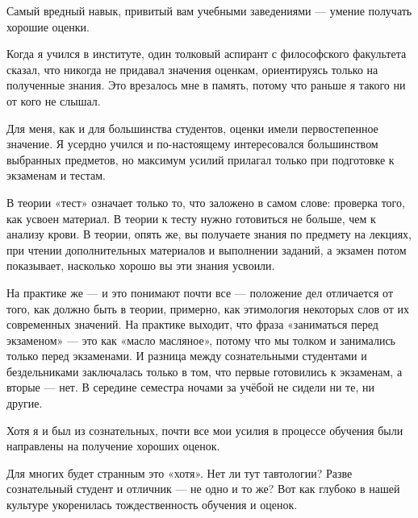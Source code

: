 \documentclass[ebook,12pt,oneside,openany]{memoir}
\begin{document}
\maketitle

Самый вредный навык, привитый вам учебными заведениями — умение
получать хорошие оценки. \newline

Когда я учился в институте, один толковый аспирант с философского
факультета сказал, что никогда не придавал значения оценкам,
ориентируясь только на полученные знания. Это врезалось мне в память,
потому что раньше я такого ни от кого не слышал. \newline

Для меня, как и для большинства студентов, оценки имели первостепенное
значение. Я усердно учился и по-настоящему интересовался большинством
выбранных предметов, но максимум усилий прилагал только при подготовке
к экзаменам и тестам. \newline

В теории «тест» означает только то, что заложено в самом слове:
проверка того, как усвоен материал. В теории к тесту нужно готовиться
не больше, чем к анализу крови. В теории, опять же, вы получаете
знания по предмету на лекциях, при чтении дополнительных материалов и
выполнении заданий, а экзамен потом показывает, насколько хорошо вы
эти знания усвоили. \newline

На практике же — и это понимают почти все — положение дел отличается
от того, как должно быть в теории, примерно, как этимология некоторых
слов от их современных значений. На практике выходит, что фраза
«заниматься перед экзаменом» — это как «масло масляное», потому что мы
толком и занимались только перед экзаменами. И разница между
сознательными студентами и бездельниками заключалась только в том, что
первые готовились к экзаменам, а вторые — нет. В середине семестра
ночами за учёбой не сидели ни те, ни другие. \newline

Хотя я и был из сознательных, почти все мои усилия в процессе обучения
были направлены на получение хороших оценок. \newline

Для многих будет странным это «хотя». Нет ли тут тавтологии? Разве
сознательный студент и отличник — не одно и то же? Вот как глубоко в
нашей культуре укоренилась тождественность обучения и оценок. \newline
\end{document}

